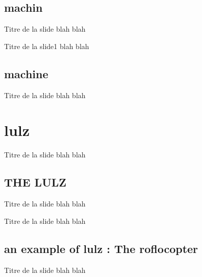 \documentclass{beamer}
\begin{document}
\subsection{machin}
\begin{frame}{Titre de la slide}
  blah blah
\end{frame}

\begin{frame}{Titre de la slide1}
  blah blah
\end{frame}

\subsection{machine}
\begin{frame}{Titre de la slide}
  blah blah
\end{frame}

\section{lulz}
\begin{frame}{Titre de la slide}
  blah blah
\end{frame}

\subsection{THE LULZ}
\begin{frame}{Titre de la slide}
  blah blah
\end{frame}
\begin{frame}{Titre de la slide}
  blah blah
\end{frame}

\subsection{an example of lulz : The roflocopter}
\begin{frame}{Titre de la slide}
  blah blah
\end{frame}
\end{document}
